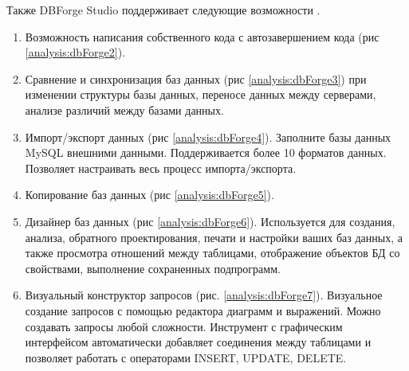 Также DBForge Studio поддерживает следующие возможности \cite{bib17}.
\begin{enumerate}
   \item Возможность написания собственного кода с автозавершением кода (рис \ref{analysis:dbForge2}).   
   \item Сравнение и синхронизация баз данных (рис \ref{analysis:dbForge3}) при изменении структуры базы данных, переносе данных между серверами, анализе различий между базами данных.
   \item Импорт/экспорт данных (рис \ref{analysis:dbForge4}). Заполните базы данных MySQL внешними данными. Поддерживается более 10 форматов данных. Позволяет настраивать весь процесс импорта/экспорта.
   \item Копирование баз данных (рис \ref{analysis:dbForge5}).
   \item Дизайнер баз данных (рис \ref{analysis:dbForge6}). Используется  для создания, анализа, обратного проектирования, печати и настройки ваших баз данных, а также  просмотра отношений между таблицами, 
   отображение объектов БД со свойствами, выполнение сохраненных подпрограмм.
   \item Визуальный конструктор запросов (рис. \ref{analysis:dbForge7}). 
   Визуальное создание запросов с помощью редактора диаграмм и выражений. 
   Можно создавать запросы любой сложности. 
   Инструмент с графическим интерфейсом автоматически добавляет соединения между таблицами и позволяет работать с операторами INSERT, UPDATE, DELETE.   
\end{enumerate}


\begin{figure}[ht!]
\end{figure}   

